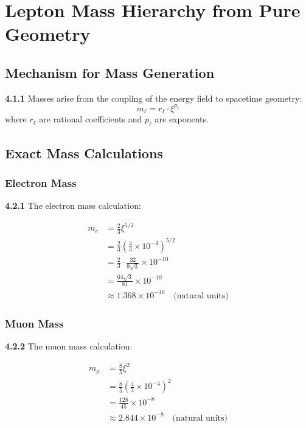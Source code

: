 \documentclass[12pt,a4paper]{article}
\newcommand{\xipar}{\xi}
\begin{document}
	\section{Lepton Mass Hierarchy from Pure Geometry}
	
	\subsection{Mechanism for Mass Generation}
	
	\noindent \textbf{4.1.1} Masses arise from the coupling of the energy field to spacetime geometry:
	\begin{equation}
		m_{\ell} = r_{\ell} \cdot \xipar^{p_{\ell}}
	\end{equation}
	where $r_{\ell}$ are rational coefficients and $p_{\ell}$ are exponents.
	
	\subsection{Exact Mass Calculations}
	
	\subsubsection{Electron Mass}
	
	\noindent \textbf{4.2.1} The electron mass calculation:
	\begin{keyresult}
		\begin{align}
			m_e &= \frac{2}{3} \xipar^{5/2} \\
			&= \frac{2}{3} \left( \frac{4}{3} \times 10^{-4} \right)^{5/2} \\
			&= \frac{2}{3} \cdot \frac{32}{9 \sqrt{3}} \times 10^{-10} \\
			&= \frac{64 \sqrt{3}}{81} \times 10^{-10} \\
			&\approx 1.368 \times 10^{-10} \quad \text{(natural units)}
		\end{align}
	\end{keyresult}
	
	\subsubsection{Muon Mass}
	
	\noindent \textbf{4.2.2} The muon mass calculation:
	\begin{keyresult}
		\begin{align}
			m_\mu &= \frac{8}{5} \xipar^{2} \\
			&= \frac{8}{5} \left( \frac{4}{3} \times 10^{-4} \right)^{2} \\
			&= \frac{128}{45} \times 10^{-8} \\
			&\approx 2.844 \times 10^{-8} \quad \text{(natural units)}
		\end{align}
	\end{keyresult}
	
\end{document}
